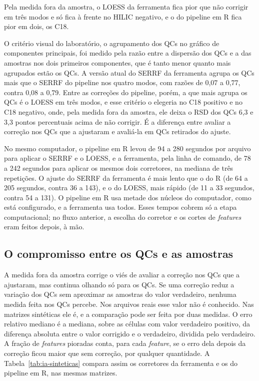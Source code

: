 Pela medida fora da amostra, o LOESS da ferramenta fica pior que não corrigir em três modos e só fica à frente no HILIC negativo, e o do pipeline em R fica pior em dois, os C18.

O critério visual do laboratório, o agrupamento dos QCs no gráfico de componentes principais, foi medido pela razão entre a dispersão dos QCs e a das amostras nos dois primeiros componentes, que é tanto menor quanto mais agrupados estão os QCs. A versão atual do SERRF da ferramenta agrupa os QCs mais que o SERRF do pipeline nos quatro modos, com razões de 0,07 a 0,77, contra 0,08 a 0,79. Entre as correções do pipeline, porém, a que mais agrupa os QCs é o LOESS em três modos, e esse critério o elegeria no C18 positivo e no C18 negativo, onde, pela medida fora da amostra, ele deixa o RSD dos QCs 6,3 e 3,3 pontos percentuais acima de não corrigir. É a diferença entre avaliar a correção nos QCs que a ajustaram e avaliá-la em QCs retirados do ajuste.

No mesmo computador, o pipeline em R levou de 94 a 280 segundos por arquivo para aplicar o SERRF e o LOESS, e a ferramenta, pela linha de comando, de 78 a 242 segundos para aplicar os mesmos dois corretores, na mediana de três repetições. O ajuste do SERRF da ferramenta é mais lento que o do R (de 64 a 205 segundos, contra 36 a 143), e o do LOESS, mais rápido (de 11 a 33 segundos, contra 54 a 131). O pipeline em R usa metade dos núcleos do computador, como está configurado, e a ferramenta usa todos. Esses tempos cobrem só a etapa computacional; no fluxo anterior, a escolha do corretor e os cortes de \emph{features} eram feitos depois, à mão.

\subsection{O compromisso entre os QCs e as amostras}

A medida fora da amostra corrige o viés de avaliar a correção nos QCs que a ajustaram, mas continua olhando só para os QCs. Se uma correção reduz a variação dos QCs sem aproximar as amostras do valor verdadeiro, nenhuma medida feita nos QCs percebe. Nos arquivos reais esse valor não é conhecido. Nas matrizes sintéticas ele é, e a comparação pode ser feita por duas medidas. O erro relativo mediano é a mediana, sobre as células com valor verdadeiro positivo, da diferença absoluta entre o valor corrigido e o verdadeiro, dividida pelo verdadeiro. A fração de \emph{features} pioradas conta, para cada \emph{feature}, se o erro dela depois da correção ficou maior que sem correção, por qualquer quantidade. A Tabela~\ref{tab:ia-sinteticas} compara assim os corretores da ferramenta e os do pipeline em R, nas mesmas matrizes.


